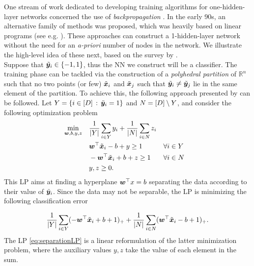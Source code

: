 One stream of work dedicated to developing training algorithms for one-hidden-layer networks concerned the use of \emph{backpropagation} \citep{BackPOP1,BackPOP2,BackpropNN}. In the early 90s, an alternative family of methods was proposed, which was heavily based on linear programs (see e.g. \cite{bennett1990neural,bennett1992robust,roy1993polynomial,mukhopadhyay1993polynomial}). These approaches can construct a 1-hidden-layer network without the need for an \emph{a-priori} number of nodes in the network. We illustrate the high-level idea of these next, based on the survey by \cite{mangasarian1993mathematical}.\\

Suppose that $\tilde{{\bm{y}}}_i\in \{-1,1\}$, thus the NN we construct will be a classifier. The training phase can be tackled via the construction of a \emph{polyhedral partition} of $\mathbb{R}^n$ such that no two points (or few) $\tilde{{\bm{x}}}_i$ and $\tilde{{\bm{x}}}_j$ such that $\tilde{{\bm{y}}}_i \neq \tilde{{\bm{y}}}_j$ lie in the same element of the partition. To achieve this, the following approach presented by \cite{bennett1992robust} can be followed. Let $Y = \{i \in [D]\, :\, \tilde{{\bm{y}}}_i = 1\}$ and $N = [D]\setminus Y$, and consider the following optimization problem
%
\begin{subequations}\label{eq:separationLP}
\begin{align}
    \min_{{\bm{w}},b,y,z} \quad & \frac{1}{|Y|} \sum_{i\in Y} y_i + \frac{1}{|N|} \sum_{i\in N} z_i \\
    & {\bm{w}}^\top \tilde{{\bm{x}}}_i - b + y \geq 1 && \forall i\in Y \\
    & - {\bm{w}}^\top \tilde{{\bm{x}}}_i + b + z \geq 1 && \forall i \in N \\
    & y,z\geq 0.
\end{align}
\end{subequations}
%
This LP aims at finding a hyperplane ${\bm{w}}^\top x  = b$ separating the data according to their value of $\tilde{{\bm{y}}}_i$. Since the data may not be separable, the LP is minimizing the following classification error

\[\frac{1}{|Y|} \sum_{i\in Y} (-{\bm{w}}^\top \tilde{{\bm{x}}}_i + b + 1)_+ + \frac{1}{|N|} \sum_{i\in N} ( {\bm{w}}^\top \tilde{{\bm{x}}}_i - b + 1 )_+.\]
%
The LP \eqref{eq:separationLP} is a linear reformulation of the latter minimization problem, where the auxiliary values $y,z$ take the value of each element in the sum.

